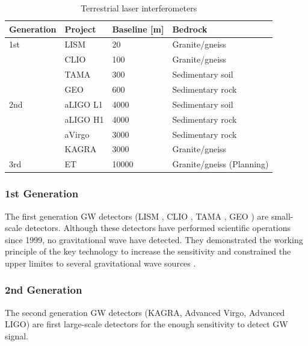 \begin{table}[h] 
  \begin{center}
    \caption{Terrestrial laser interferometers \cite{chen2017brief,beker2013low}}\label{tb:tb101}
    \begin{tabular}{llll} 
      \hline
      Generation &Project & Baseline [m] & Bedrock \\ \hline \hline
      1st &LISM  & 20    & Granite/gneiss \\ 
      &CLIO  & 100   & Granite/gneiss \\
      &TAMA  & 300   & Sedimentary soil \cite{1970449}\\ 
      &GEO   & 600   & Sedimentary rock \\ \hline
      2nd &aLIGO L1 & 4000  & Sedimentary soil \\
      &aLIGO H1 & 4000  & Sedimentary rock \\
      &aVirgo   & 3000  & Sedimentary rock \\
      &KAGRA   & 3000  & Granite/gneiss \\ \hline
      3rd &ET      & 10000 & Granite/gneiss (Planning) \\
      \hline
    \end{tabular}
  \end{center}
\end{table}


\subsubsection{1st Generation}
The first generation GW detectors (LISM \cite{sato2004ultrastable}, CLIO \cite{ohashi2003design}, TAMA \cite{ando2001stable}, GEO \cite{grote2010geo}) are small-scale detectors. Although these detectors have performed scientific operations since 1999, no gravitational wave have detected. They demonstrated the working principle of the key technology to increase the sensitivity and constrained the upper limites to several gravitational wave sources \cite{takahashi2004coincidence,Fairhurst2011}.

\subsubsection{2nd Generation}
The second generation GW detectors (KAGRA\cite{akutsu2018kagra}, Advanced Virgo\cite{acernese2014advanced}, Advanced LIGO\cite{aasi2015advanced}) are first large-scale detectors for the enough sensitivity to detect GW signal.

